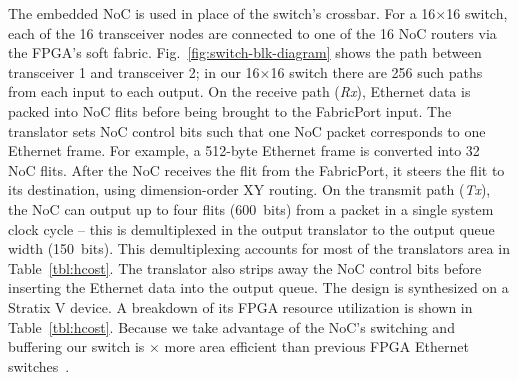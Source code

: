 The embedded NoC is used in place of the switch's crossbar.
For a 16$\times$16 switch, each of the 16 transceiver nodes are connected to one of the 16 NoC routers via the FPGA's soft fabric.
Fig.~\ref{fig:switch-blk-diagram} shows the path between transceiver 1 and transceiver 2; in our 16$\times$16 switch there are 256 such paths from each input to each output. 
On the receive path (\textit{Rx}), Ethernet data is packed into NoC flits before being brought to the FabricPort input.
The translator sets NoC control bits such that one NoC packet corresponds to one Ethernet frame.
For example, a 512-byte Ethernet frame is converted into 32 NoC flits.
After the NoC receives the flit from the FabricPort, it steers the flit to its destination, using dimension-order XY routing.
On the transmit path (\textit{Tx}), the NoC can output up to four flits (600~bits) from a packet in a single system clock cycle -- this is demultiplexed in the output translator to the output queue width (150~bits).
This demultiplexing accounts for most of the translators area in Table~\ref{tbl:hcost}.
The translator also strips away the NoC control bits before inserting the Ethernet data into the output queue.
The design is synthesized on a Stratix V device.
A breakdown of its FPGA resource utilization is shown in Table~\ref{tbl:hcost}.
Because we take advantage of the NoC's switching and buffering our switch is $\times$ more area efficient than previous FPGA Ethernet switches~\cite{dai-zhu}.

